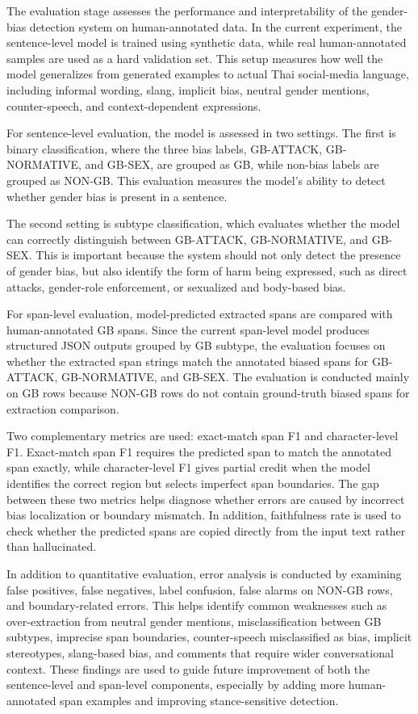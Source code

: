 \documentclass[12pt,oneside,openright,a4paper]{cpe-english-project}
\begin{document}
The evaluation stage assesses the performance and interpretability of the gender-bias detection system on human-annotated data. In the current experiment, the sentence-level model is trained using synthetic data, while real human-annotated samples are used as a hard validation set. This setup measures how well the model generalizes from generated examples to actual Thai social-media language, including informal wording, slang, implicit bias, neutral gender mentions, counter-speech, and context-dependent expressions.

For sentence-level evaluation, the model is assessed in two settings. The first is binary classification, where the three bias labels, GB-ATTACK, GB-NORMATIVE, and GB-SEX, are grouped as GB, while non-bias labels are grouped as NON-GB. This evaluation measures the model's ability to detect whether gender bias is present in a sentence.

The second setting is subtype classification, which evaluates whether the model can correctly distinguish between GB-ATTACK, GB-NORMATIVE, and GB-SEX. This is important because the system should not only detect the presence of gender bias, but also identify the form of harm being expressed, such as direct attacks, gender-role enforcement, or sexualized and body-based bias.

For span-level evaluation, model-predicted extracted spans are compared with human-annotated GB spans. Since the current span-level model produces structured JSON outputs grouped by GB subtype, the evaluation focuses on whether the extracted span strings match the annotated biased spans for GB-ATTACK, GB-NORMATIVE, and GB-SEX. The evaluation is conducted mainly on GB rows because NON-GB rows do not contain ground-truth biased spans for extraction comparison.

Two complementary metrics are used: exact-match span F1 and character-level F1. Exact-match span F1 requires the predicted span to match the annotated span exactly, while character-level F1 gives partial credit when the model identifies the correct region but selects imperfect span boundaries. The gap between these two metrics helps diagnose whether errors are caused by incorrect bias localization or boundary mismatch. In addition, faithfulness rate is used to check whether the predicted spans are copied directly from the input text rather than hallucinated.

In addition to quantitative evaluation, error analysis is conducted by examining false positives, false negatives, label confusion, false alarms on NON-GB rows, and boundary-related errors. This helps identify common weaknesses such as over-extraction from neutral gender mentions, misclassification between GB subtypes, imprecise span boundaries, counter-speech misclassified as bias, implicit stereotypes, slang-based bias, and comments that require wider conversational context. These findings are used to guide future improvement of both the sentence-level and span-level components, especially by adding more human-annotated span examples and improving stance-sensitive detection.
\end{document}
